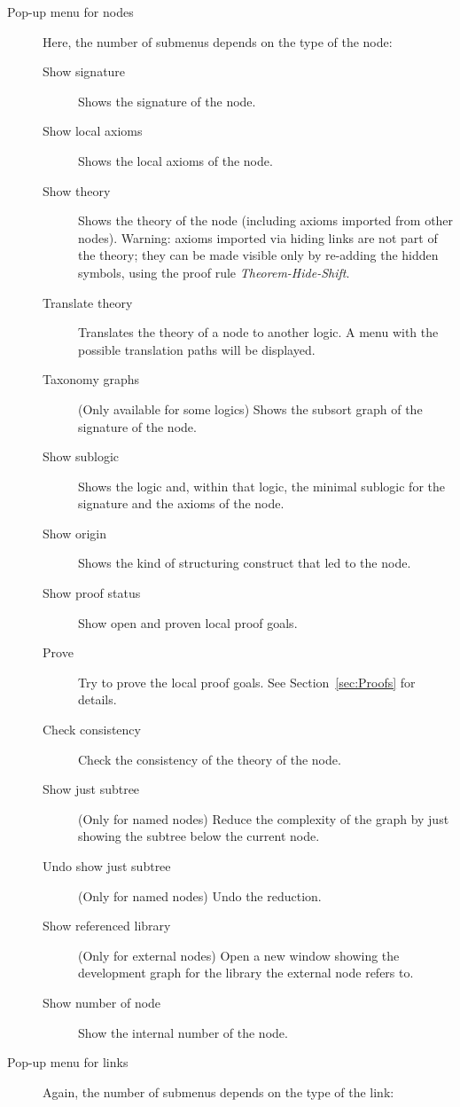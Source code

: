 \documentclass{article}
\begin{document}
\begin{description}
\begin{description}
\end{description}
\item[Pop-up menu for nodes]
Here, the number of submenus depends on the type of the node:
\begin{description}
\item[Show signature] Shows the signature of the node.
\item[Show local axioms] Shows the local axioms of the node.
\item[Show theory] Shows the theory of the node (including axioms
imported from other nodes). Warning: axioms imported via hiding  links
are not part of the theory; they can be made visible only by re-adding
the hidden symbols, using the proof rule \emph{Theorem-Hide-Shift}.
\item[Translate theory] Translates the theory of a node to another logic.
A menu with the possible translation paths will be displayed.
\item[Taxonomy graphs] (Only available for some logics) Shows the subsort graph of the signature of the node.
\item[Show sublogic] Shows the logic and, within that logic, the minimal sublogic
for the signature and the axioms of the node.
\item[Show origin] Shows the kind of \CASL structuring construct that
led to the node.
\item[Show proof status] Show open and proven local proof goals.
\item[Prove] Try to prove the local proof goals. See Section~\ref{sec:Proofs} 
for details.
\item[Check consistency] Check the consistency of the theory of the node.
\item[Show just subtree] (Only for named nodes) Reduce the complexity
of the graph by just showing the subtree below the current node.
\item[Undo show just subtree] (Only for named nodes) Undo the reduction.
\item[Show referenced library] (Only for external nodes) Open a new window
showing the development graph for the library the external node refers to.
\item[Show number of node] Show the internal number of the node.
\end{description}
\item[Pop-up menu for links]
Again, the number of submenus depends on the type of the link:

\end{description}
\end{document}
